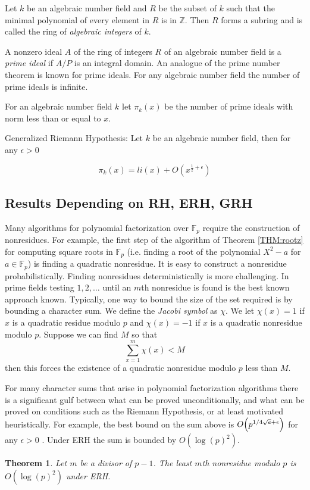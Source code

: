 \documentclass{article}
\let\originalleft\left
\let\originalright\right
\renewcommand{\left}{\mathopen{}\mathclose\bgroup\originalleft}
\renewcommand{\right}{\aftergroup\egroup\originalright}
\newcounter{dummy} \numberwithin{dummy}{section}
\theoremstyle{plain}
\newtheorem{thm}[dummy]{Theorem}
\theoremstyle{definition}
\def\Fp {{ \mathbb{F} _ {p} }}
\begin{document}
				Let $k$ be an algebraic number field and $R$ be the subset of $k$ such that the minimal polynomial of every element in $R$ is in $\mathbb{Z}$. Then $R$ forms a subring and is called the ring of \emph{algebraic integers} of $k$.
 
				A nonzero ideal $A$ of the ring of integers $R$ of an algebraic number field is a \emph{prime ideal} if $A/P$ is an integral domain. An analogue of the prime number theorem is known for prime ideals. For any algebraic number field the number of prime ideals is infinite. 

				For an algebraic number field $k$ let $\pi_k(x)$ be the number of prime ideals with norm less than or equal to $x$. 

				Generalized Riemann Hypothesis: Let $k$ be an algebraic number field, then for any $\epsilon>0$

				\[\pi_k(x) = li(x)+O(x^{\frac {1}{2}+\epsilon})\]
   
		\subsection{Results Depending on RH, ERH, GRH}
		    Many algorithms for polynomial factorization over $\Fp$ require the construction of nonresidues. For example, the first step of the algorithm of Theorem \ref{THM:rootz} for computing square roots in $\Fp$ (i.e. finding a root of the polynomial $X^2-a$ for $a \in \Fp$) is finding a quadratic nonresidue. It is easy to construct a nonresidue probabilistically. Finding nonresidues deterministically is more challenging. In prime fields testing $1, 2, \ldots$ until an $m$th nonresidue is found is the best known approach known. Typically, one way to bound the size of the set required is by bounding a character sum. We define the \emph{Jacobi symbol} as $\chi$. We let $\chi(x)=1$ if $x$ is a quadratic residue modulo $p$ and $\chi(x)=-1$ if $x$ is a quadratic nonresidue modulo $p$. Suppose we can find $M$ so that
		    \[\sum_{x=1}^{m}{\chi(x)}<M\]
		    \noindent then this forces the existence of a quadratic nonresidue modulo $p$ less than $M$. 

		    For many character sums that arise in polynomial factorization algorithms there is a significant gulf between what can be proved unconditionally, and what can be proved on conditions such as the Riemann Hypothesis, or at least motivated heuristically. For example, the best bound on the sum above is $O \left( p^{1/{4\sqrt{e}}+\epsilon } \right)$ for any $\epsilon>0$ \cite{burgess}. Under ERH the sum is bounded by $O(\log(p)^2)$. 
		    \begin{thm} 
		    \label{THM:ERHNonres}
		        Let $m$ be a divisor of $p-1$. The least $m$th nonresidue modulo $p$ is $O(\log(p)^2)$ under ERH.
		    \end{thm}
\end{document}
